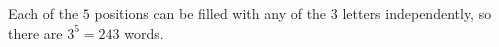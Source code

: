 Each of the $5$ positions can be filled with any of the $3$ letters independently, so there are $3^5=\boxed{243}$ words.
